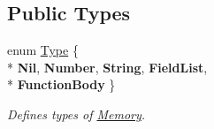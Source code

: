\subsection*{Public Types}
\begin{DoxyCompactItemize}
\item 
\hypertarget{classMemory_a9193c3e610b1728964440284db90c812}{}enum \hyperlink{classMemory_a9193c3e610b1728964440284db90c812}{Type} \{ \\*
{\bfseries Nil}, 
{\bfseries Number}, 
{\bfseries String}, 
{\bfseries Field\+List}, 
\\*
{\bfseries Function\+Body}
 \}\label{classMemory_a9193c3e610b1728964440284db90c812}

\begin{DoxyCompactList}\small\item\em Defines types of \hyperlink{classMemory}{Memory}. \end{DoxyCompactList}\end{DoxyCompactItemize}
